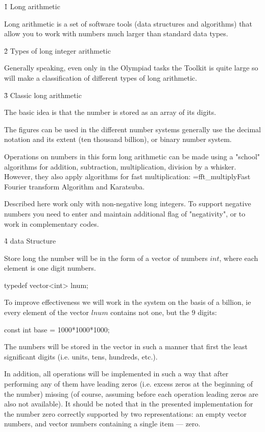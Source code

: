\h1{ Long arithmetic }

Long arithmetic is a set of software tools (data structures and algorithms) that allow you to work with numbers much larger than standard data types.


\h2{ Types of long integer arithmetic }

Generally speaking, even only in the Olympiad tasks the Toolkit is quite large so will make a classification of different types of long arithmetic.


\h3{ Classic long arithmetic }

The basic idea is that the number is stored as an array of its digits.

The figures can be used in the different number systems generally use the decimal notation and its extent (ten thousand billion), or binary number system.

Operations on numbers in this form long arithmetic can be made using a "school" algorithms for addition, subtraction, multiplication, division by a whisker. However, they also apply algorithms for fast multiplication: \algohref=fft_multiply{Fast Fourier transform} Algorithm and Karatsuba.

Described here work only with non-negative long integers. To support negative numbers you need to enter and maintain additional flag of "negativity", or to work in complementary codes.


\h4{ data Structure }

Store long the number will be in the form of a vector of numbers $int$, where each element is one digit numbers.

\code
typedef vector<int> lnum;
\endcode

To improve effectiveness we will work in the system on the basis of a billion, ie every element of the vector $lnum$ contains not one, but the $9$ digits:

\code
const int base = 1000*1000*1000;
\endcode

The numbers will be stored in the vector in such a manner that first the least significant digits (i.e. units, tens, hundreds, etc.).

In addition, all operations will be implemented in such a way that after performing any of them have leading zeros (i.e. excess zeros at the beginning of the number) missing (of course, assuming before each operation leading zeros are also not available). It should be noted that in the presented implementation for the number zero correctly supported by two representations: an empty vector numbers, and vector numbers containing a single item --- zero.


